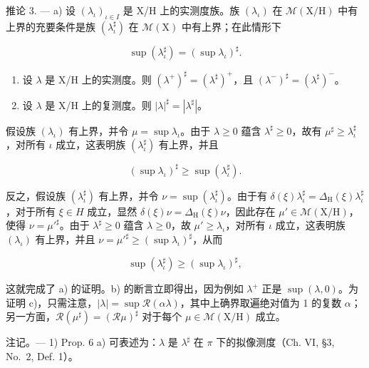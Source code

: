 推论 3. --- a) 设 \((\lambda_{\iota})_{\iota \in I}\) 是 X/H 上的实测度族。族 \((\lambda_{\iota})\) 在 \(\mathcal{M}(\mathrm{X / H})\) 中有上界的充要条件是族 \((\lambda_{\iota}^{\sharp})\) 在 \(\mathcal{M}(\mathrm{X})\) 中有上界；在此情形下

\[
\sup (\lambda_ {\iota} ^ {\sharp}) = (\sup \lambda_ {\iota}) ^ {\sharp}.
\]

\begin{enumerate}
\def\labelenumi{\alph{enumi})}
\setcounter{enumi}{1}
\item
  设 \(\lambda\) 是 X/H 上的实测度。则 \((\lambda^{+})^{\sharp} = (\lambda^{\sharp})^{+}\)，且 \((\lambda^{-})^{\sharp} = (\lambda^{\sharp})^{-}\)。
\item
  设 \(\lambda\) 是 X/H 上的复测度。则 \(|\lambda|^{\sharp} = |\lambda^{\sharp}|\)。
\end{enumerate}

假设族 \((\lambda_{\iota})\) 有上界，并令 \(\mu = \sup \lambda_{\iota}\)。由于 \(\lambda \geqslant 0\) 蕴含 \(\lambda^{\sharp} \geqslant 0\)，故有 \(\mu^{\sharp} \geqslant \lambda_{\iota}^{\sharp}\)，对所有 \(\iota\) 成立，这表明族 \((\lambda_{\iota}^{\sharp})\) 有上界，并且

\[
(\sup \lambda_ {\iota}) ^ {\sharp} \geqslant \sup (\lambda_ {\iota} ^ {\sharp}).
\]

反之，假设族 \((\lambda_{\iota}^{\sharp})\) 有上界，并令 \(\nu = \sup(\lambda_{\iota}^{\sharp})\)。由于有 \(\delta(\xi)\lambda_{\iota}^{\sharp} = \Delta_{\mathrm{H}}(\xi)\lambda_{\iota}^{\sharp}\)，对于所有 \(\xi \in H\) 成立，显然 \(\delta(\xi)\nu = \Delta_{\mathrm{H}}(\xi)\nu\)，因此存在 \(\mu' \in \mathcal{M}(\mathrm{X}/\mathrm{H})\)，使得 \(\nu = \mu'^{\sharp}\)。由于 \(\lambda^{\sharp} \geqslant 0\) 蕴含 \(\lambda \geqslant 0\)，故 \(\mu' \geqslant \lambda_{\iota}\)，对所有 \(\iota\) 成立，这表明族 \((\lambda_{\iota})\) 有上界，并且 \(\nu = \mu'^{\sharp} \geqslant (\sup \lambda_{\iota})^{\sharp}\)，从而

\[
\sup \left(\lambda_ {\iota} ^ {\sharp}\right) \geqslant \left(\sup \lambda_ {\iota}\right) ^ {\sharp},
\]

这就完成了 a) 的证明。b) 的断言立即得出，因为例如 \(\lambda^{+}\) 正是 \(\sup(\lambda,0)\)。为证明 c)，只需注意，\(|\lambda| = \sup \mathcal{R}(\alpha \lambda)\)，其中上确界取遍绝对值为 1 的复数 \(\alpha\)；另一方面，\(\mathcal{R}(\mu^{\sharp}) = (\mathcal{R}\mu)^{\sharp}\) 对于每个 \(\mu \in \mathcal{M}(\mathrm{X / H})\) 成立。

注记。--- 1) Prop. 6 a) 可表述为：\(\lambda\) 是 \(\lambda^{\sharp}\) 在 \(\pi\) 下的拟像测度（Ch. VI, §3, No.~2, Def. 1）。

